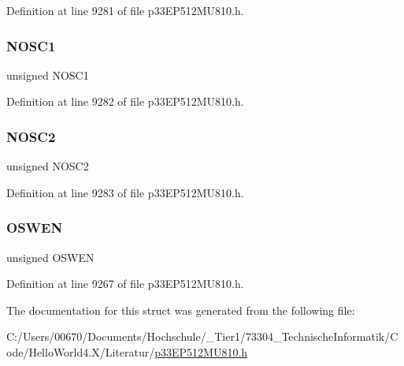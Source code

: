 Definition at line 9281 of file p33\+E\+P512\+M\+U810.\+h.

\mbox{\label{structtag_o_s_c_c_o_n_b_i_t_s_a3fa533f3003798bab77718568958e46b}} 
\subsubsection{\texorpdfstring{N\+O\+S\+C1}{NOSC1}}
{\footnotesize\ttfamily unsigned N\+O\+S\+C1}



Definition at line 9282 of file p33\+E\+P512\+M\+U810.\+h.

\mbox{\label{structtag_o_s_c_c_o_n_b_i_t_s_a19d734695a6e4304c9246eb951ba4804}} 
\subsubsection{\texorpdfstring{N\+O\+S\+C2}{NOSC2}}
{\footnotesize\ttfamily unsigned N\+O\+S\+C2}



Definition at line 9283 of file p33\+E\+P512\+M\+U810.\+h.

\mbox{\label{structtag_o_s_c_c_o_n_b_i_t_s_aa6599e29f403058e69b54fc40d98f38e}} 
\subsubsection{\texorpdfstring{O\+S\+W\+EN}{OSWEN}}
{\footnotesize\ttfamily unsigned O\+S\+W\+EN}



Definition at line 9267 of file p33\+E\+P512\+M\+U810.\+h.



The documentation for this struct was generated from the following file\+:\begin{DoxyCompactItemize}
\item 
C\+:/\+Users/00670/\+Documents/\+Hochschule/\+\_\+\+Tier1/73304\+\_\+\+Technische\+Informatik/\+Code/\+Hello\+World4.\+X/\+Literatur/\hyperlink{p33_e_p512_m_u810_8h}{p33\+E\+P512\+M\+U810.\+h}\end{DoxyCompactItemize}
